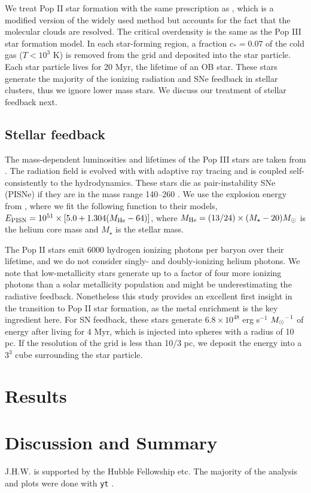 \documentclass[apjl]{emulateapj}
\begin{document}
We treat Pop II star formation with the same prescription as
\citet{Wise09}, which is a modified version of the widely used
\citet{Cen92} method but accounts for the fact that the molecular
clouds are resolved.  The critical overdensity is the same as the Pop
III star formation model.  In each star-forming region, a fraction
$c_* = 0.07$ of the cold gas ($T < 10^3$ K) is removed from the grid
and deposited into the star particle.  Each star particle lives for 20
Myr, the lifetime of an OB star.  These stars generate the majority of
the ionizing radiation and SNe feedback in stellar clusters, thus we
ignore lower mass stars.  We discuss our treatment of stellar feedback
next.  

\subsection{Stellar feedback}

The mass-dependent luminosities and lifetimes of the Pop III stars are
taken from \citet{Schaerer02}.  The radiation field is evolved with
with adaptive ray tracing \citep{Abel02, Wise10} and is coupled
self-consistently to the hydrodynamics.  These stars die as
pair-instability SNe (PISNe) if they are in the mass range 140--260
\Ms \citep{Heger02}.  We use the explosion energy from
\citeauthor{Heger02}, where we fit the following function to their
models, $E_{\rm PISN} = 10^{51} \times [5.0 + 1.304 (M_{\rm He} -
64)]$, where $M_{\rm He} = (13/24) \times (M_\star - 20) \Ms$ is the
helium core mass and $M_\star$ is the stellar mass.

The Pop II stars emit 6000 hydrogen ionizing photons per baryon over
their lifetime, and we do not consider singly- and doubly-ionizing
helium photons.  We note that low-metallicity stars generate up to a
factor of four more ionizing photons than a solar metallicity
population \citep{Schaerer03} and might be underestimating the
radiative feedback.  Nonetheless this study provides an excellent
first insight in the transition to Pop II star formation, as the metal
enrichment is the key ingredient here.  For SN feedback, these stars
generate $6.8 \times 10^{48}$ erg s$^{-1}$ $\Ms^{-1}$ of energy after
living for 4 Myr, which is injected into spheres with a radius of 10
pc.  If the resolution of the grid is less than 10/3 pc, we deposit
the energy into a $3^3$ cube surrounding the star particle.

\section{Results}
\label{sec:results}

\section{Discussion and Summary}

\acknowledgments

J.H.W. is supported by the Hubble Fellowship etc.  The majority of the
analysis and plots were done with \texttt{yt} \citep{yt}.

%

\end{document}

